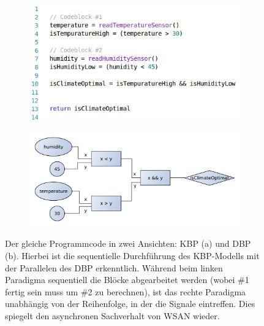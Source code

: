\begin{figure}[h]
\centering
\begin{subfigure}{.45\textwidth}
  \centering
  \includegraphics[width=1\linewidth]{bilder/chapter4/chapter4_2/codekbpbeispiel.png}
  \caption{}
  \label{fig:subvgldbptexttext}
\end{subfigure}%
\begin{subfigure}{.55\textwidth}
  \centering
  \includegraphics[width=1\linewidth]{bilder/chapter4/chapter4_2/beispieldatenfluss.pdf}
  \caption{}
  \label{fig:subvgldbptextdbp}
\end{subfigure}
    \caption{Der gleiche Programmcode in zwei Ansichten: \ac{KBP} (a) und \ac{DBP} (b). Hierbei ist die sequentielle Durchführung des \ac{KBP}-Modells mit der Parallelen des \ac{DBP} erkenntlich. Während beim linken Paradigma sequentiell die Blöcke abgearbeitet werden (wobei \#1 fertig sein muss um \#2 zu berechnen), ist das rechte Paradigma unabhängig von der Reihenfolge, in der die Signale eintreffen. Dies spiegelt den asynchronen Sachverhalt von \ac{WSAN} wieder.}
    \label{fig:bfd}
\end{figure}


